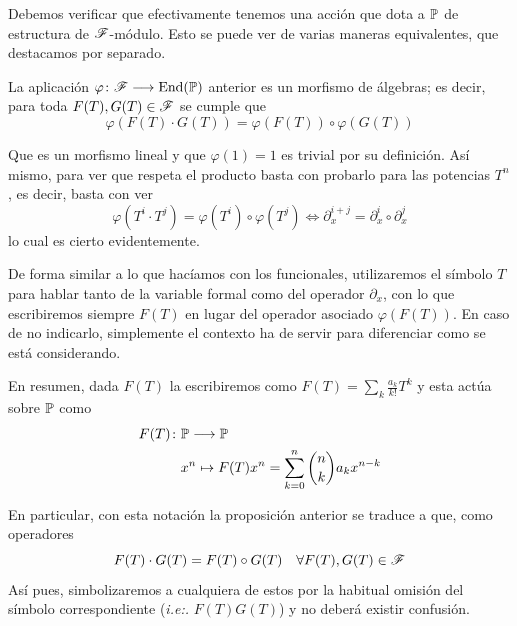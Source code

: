 Debemos verificar que efectivamente tenemos una acción que dota a $\mathbb{P}$ de estructura de $\mathscr{F}$-módulo. Esto se puede ver de varias maneras equivalentes, que destacamos por separado.


\begin{proposicion}
    La aplicación $\varphi \colon \mathscr{F} \longrightarrow \operatorname*{End}(\mathbb{P})$ anterior es un morfismo de álgebras; es decir, para toda $F(T), G(T) \in \mathscr{F}$ se cumple que
    \begin{equation*}
        \varphi(F(T) \cdot G(T)) = \varphi(F(T)) \circ \varphi(G(T))
    \end{equation*}
\end{proposicion}

\begin{demo}
    Que es un morfismo lineal y que $\varphi(1) = 1$ es trivial por su definición. Así mismo, para ver que respeta el producto basta con probarlo para las potencias $T^n$, es decir, basta con ver
    \begin{equation*}
        \varphi(T^{i} \cdot T^{j}) = \varphi(T^{i}) \circ \varphi(T^{j}) \iff \partial_x^{i+j} = \partial_x^{i} \circ \partial_x^{j}
    \end{equation*}
    lo cual es cierto evidentemente.
\end{demo}

De forma similar a lo que hacíamos con los funcionales, utilizaremos el símbolo $T$ para hablar tanto de la variable formal como del operador $\partial_{x}$, con lo que escribiremos siempre $F(T)$ en lugar del operador asociado $\varphi(F(T))$. En caso de no indicarlo, simplemente el contexto ha de servir para diferenciar como se está considerando.

En resumen, dada $F(T)$ la escribiremos como $F(T) = \sum_k \frac{a_k}{k!}T^k$ y esta actúa sobre $\mathbb{P}$ como
\begin{align}\label{serie como operador}
    F(T) \colon & \mathbb{P} \longrightarrow \mathbb{P} \nonumber \\
    & x^n \mapsto F(T)x^n = \sum_{k=0}^n \binom{n}{k}a_kx^{n-k}
\end{align}

\begin{obs}
    En particular, con esta notación la proposición anterior se traduce a que, como operadores
    \begin{equation*}
        F(T) \cdot G(T) = F(T) \circ G(T) \quad \forall F(T), G(T) \in \mathscr{F}
    \end{equation*} 
    Así pues, simbolizaremos a cualquiera de estos por la habitual omisión del símbolo correspondiente (\textit{i.e:.} $F(T)G(T)$) y no deberá existir confusión.
\end{obs}


